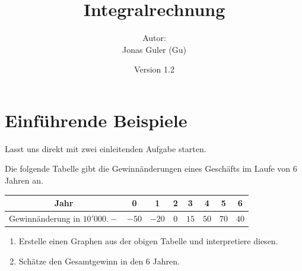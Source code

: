 \documentclass[11pt,oneside]{article}
\newcommand{\Skriptname}{Integralrechnung}
\newcommand{\Autor}{Jonas Guler (Gu)}
\begin{document}
\begin{titlepage}
	\clearpage
	\title{\Huge\textbf{\Skriptname} \\[1cm]}
	\author{Autor:\\ \Autor}
	\date{\normalsize {Version 1.2}\\ \datelong}
	\maketitle
	\thispagestyle{empty}
	\vfill
	\tableofcontents
\end{titlepage}
\section{Einführende Beispiele}
	Lasst uns direkt mit zwei einleitenden Aufgabe starten.
	\begin{aufgabe}[Gewinnänderungen]
		Die folgende Tabelle gibt die Gewinnänderungen eines Geschäfts im Laufe von $6$ Jahren an.
		\begin{table}[H]
			\centering
			\begin{tabular}{c|c|c|c|c|c|c|c}
				Jahr & 0 & 1 & 2 & 3 & 4 & 5 & 6 \\\hline
				Gewinnänderung in $10'000.-$ & $-50$ & $-20$ & $0$ & $15$ & $50$ & $70$ & $40$
			\end{tabular}
		\end{table}
		\begin{enumerate}[label=\alph*)]
			\item Erstelle einen Graphen aus der obigen Tabelle und interpretiere diesen.
			\item Schätze den Gesamtgewinn in den $6$ Jahren.
		\end{enumerate}
	\end{aufgabe}
\end{document}
